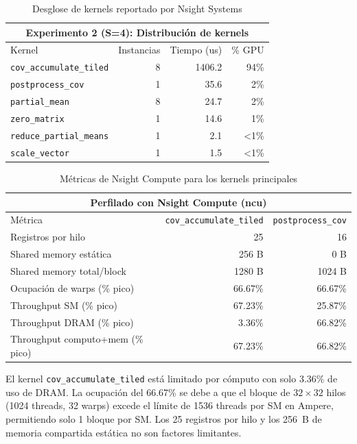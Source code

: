 \documentclass[12pt,a4paper]{article}
\begin{document}
\begin{table}[H]
\centering
\begin{tabular}{lrrr}
\toprule
\multicolumn{4}{c}{\textbf{Experimento 2 (S=4): Distribuci\'on de kernels}} \\
\midrule
Kernel & Instancias & Tiempo (us) & \% GPU \\
\midrule
\texttt{cov\_accumulate\_tiled} & 8 & 1406.2 & 94\% \\
\texttt{postprocess\_cov}         & 1 & 35.6   &  2\% \\
\texttt{partial\_mean}            & 8 & 24.7   &  2\% \\
\texttt{zero\_matrix}             & 1 & 14.6   &  1\% \\
\texttt{reduce\_partial\_means}   & 1 & 2.1    & <1\% \\
\texttt{scale\_vector}            & 1 & 1.5    & <1\% \\
\bottomrule
\end{tabular}
\caption{Desglose de kernels reportado por Nsight Systems}
\end{table}

\begin{table}[H]
\centering
\begin{tabular}{lrr}
\toprule
\multicolumn{3}{c}{\textbf{Perfilado con Nsight Compute (ncu)}} \\
\midrule
Métrica & \texttt{cov\_accumulate\_tiled} & \texttt{postprocess\_cov} \\
\midrule
Registros por hilo & 25 & 16 \\
Shared memory estática & 256 B & 0 B \\
Shared memory total/block & 1280 B & 1024 B \\
Ocupación de warps (\% pico) & 66.67\% & 66.67\% \\
Throughput SM (\% pico) & 67.23\% & 25.87\% \\
Throughput DRAM (\% pico) & 3.36\% & 66.82\% \\
Throughput computo+mem (\% pico) & 67.23\% & 66.82\% \\
\bottomrule
\end{tabular}
\caption{Métricas de Nsight Compute para los kernels principales}
\end{table}

El kernel \texttt{cov\_accumulate\_tiled} está limitado por cómputo con solo
3.36\% de uso de DRAM. La ocupación del 66.67\% se debe a que el bloque de
$32\times32$ hilos (1024 threads, 32 warps) excede el límite de 1536 threads por SM
en Ampere, permitiendo solo 1 bloque por SM. Los 25 registros por hilo y los 256~B
de memoria compartida estática no son factores limitantes.
\end{document}

